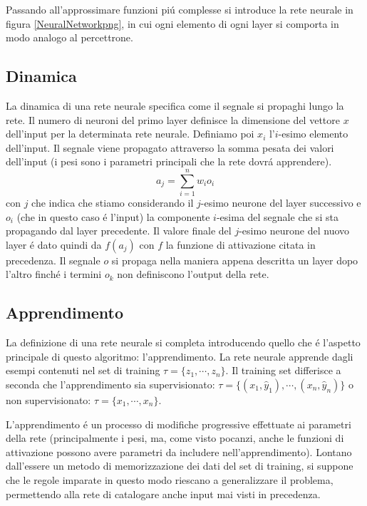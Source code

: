 \documentclass[a4paper,10pt]{article}
\begin{document}
 Passando all'approssimare funzioni pi\'u complesse si introduce la rete neurale in figura \ref{NeuralNetworkpng}, in cui ogni elemento di ogni layer si comporta in modo analogo al percettrone.

 
 \subsection{Dinamica}
 
 La dinamica di una rete neurale specifica come il segnale si propaghi lungo la rete. Il numero di neuroni del primo layer definisce la dimensione del vettore $x$ dell'input per la determinata rete neurale. Definiamo poi $x_i$ l'$i$-esimo elemento dell'input. 
 Il segnale viene propagato attraverso la somma pesata dei valori dell'input (i pesi sono i parametri principali che la rete dovr\'a apprendere).
 \begin{equation}
  a_j = \sum_{i=1}^n w_i o_i
 \end{equation}
 con $j$ che indica che stiamo considerando il $j$-esimo neurone del layer successivo e $o_i$ (che in questo caso \'e l'input) la componente $i$-esima del segnale che si sta propagando dal layer precedente. Il valore finale del $j$-esimo neurone del nuovo layer \'e dato quindi da $f(a_j)$ con $f$ la funzione di attivazione citata in precedenza. Il segnale $o$ si propaga nella maniera appena descritta un layer dopo l'altro finch\'e i termini $o_k$ non definiscono l'output della rete.
 
 \subsection{Apprendimento}
 
 La definizione di una rete neurale si completa introducendo quello che \'e l'aspetto principale di questo algoritmo: l'apprendimento. 
 La rete neurale apprende dagli esempi contenuti nel set di training $\tau = \{ z_1, \cdots ,z_n \} $. Il training set differisce a seconda che l'apprendimento sia supervisionato: $\tau = \{ (x_1,\widehat{y}_1), \cdots , (x_n,\widehat{y}_n)\}$ o non supervisionato: $\tau = \{x_1,\cdots,x_n\}$.
 
 L'apprendimento \'e un processo di modifiche progressive effettuate ai parametri della rete (principalmente i pesi, ma, come visto pocanzi, anche le funzioni di attivazione possono avere parametri da includere nell'apprendimento). Lontano dall'essere un metodo di memorizzazione dei dati del set di training, si suppone che le regole imparate in questo modo riescano a generalizzare il problema, permettendo alla rete di catalogare anche input mai visti in precedenza.
 
\end{document}
